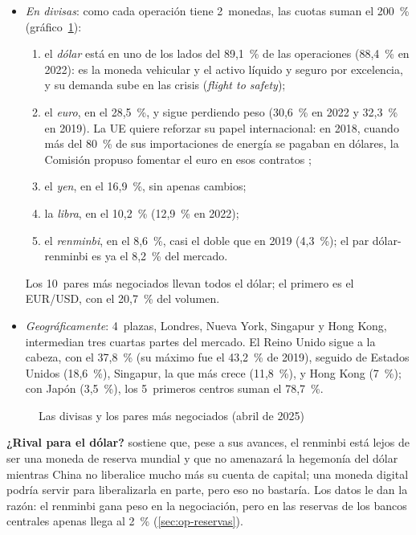 \documentclass[11pt]{article}
\begin{document}
\begin{itemize}
\item \emph{En divisas}: como cada operación tiene 2~monedas, las cuotas suman el 200~\% (gráfico~\ref{fig:divisas-bis})\nocite{BIS2026TrienalDatos}:
  \begin{enumerate}
  \item el \emph{dólar} está en uno de los lados del 89,1~\% de las operaciones (88,4~\% en 2022): es la moneda vehicular y el activo líquido y seguro por excelencia, y su demanda sube en las crisis (\emph{flight to safety});
  \item el \emph{euro}, en el 28,5~\%, y sigue perdiendo peso (30,6~\% en 2022 y 32,3~\% en 2019). La UE quiere reforzar su papel internacional: en 2018, cuando más del 80~\% de sus importaciones de energía se pagaban en dólares, la Comisión propuso fomentar el euro en esos contratos\nocite{CE2018Euro} ;
  \item el \emph{yen}, en el 16,9~\%, sin apenas cambios;
  \item la \emph{libra}, en el 10,2~\% (12,9~\% en 2022);
  \item el \emph{renminbi}, en el 8,6~\%, casi el doble que en 2019 (4,3~\%); el par dólar-renminbi es ya el 8,2~\% del mercado.
  \end{enumerate}
  Los 10~pares más negociados llevan todos el dólar; el primero es el EUR/USD, con el 20,7~\% del volumen.
\item \emph{Geográficamente}: 4~plazas, Londres, Nueva York, Singapur y Hong Kong, intermedian tres cuartas partes del mercado. El Reino Unido sigue a la cabeza, con el 37,8~\% (su máximo fue el 43,2~\% de 2019), seguido de Estados Unidos (18,6~\%), Singapur, la que más crece (11,8~\%), y Hong Kong (7~\%); con Japón (3,5~\%), los 5~primeros centros suman el 78,7~\%\nocite{BIS2026TrienalDatos}.
\end{itemize}

\begin{figure}[H]
\centering
\caption{Las divisas y los pares más negociados (abril de 2025)}\label{fig:divisas-bis}
\end{figure}

\begin{anotaciones}
\textbf{¿Rival para el dólar?} \textcite{Wei2023Renminbi} sostiene que, pese a sus avances, el renminbi está lejos de ser una moneda de reserva mundial y que no amenazará la hegemonía del dólar mientras China no liberalice mucho más su cuenta de capital; una moneda digital podría servir para liberalizarla en parte, pero eso no bastaría. Los datos le dan la razón: el renminbi gana peso en la negociación, pero en las reservas de los bancos centrales apenas llega al 2~\% (\ref{sec:op-reservas}).
\end{anotaciones}
\end{document}
